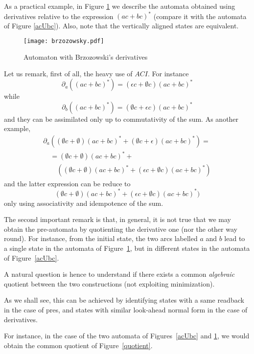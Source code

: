 \documentclass[preprint]{sigplanconf}
\newcommand{\der}[2]{\ensuremath{\partial_{#1}(#2)}}
\begin{document}
As a practical example, in Figure \ref{acUbc1} we describe 
the automata obtained using derivatives relative to the 
expression $(ac + bc)^*$ (compare it
with the automata of Figure \ref{acUbc}). Also, note that the
vertically aligned states are equivalent.

\begin{figure}[htp]
\begin{center}
\texttt{[image: brzozowsky.pdf]}
\caption{Automaton with Brzozowski's derivatives\label{acUbc1}}
\end{center}
\end{figure}

\noindent
Let us remark, first of all, the heavy use of $ACI$. For instance 
\[\der{a}{(ac+bc)^*} = (\epsilon c + \emptyset c)(ac+bc)^*\]
while
\[\der{b}{(ac+bc)^*} = (\emptyset c + \epsilon c)(ac+bc)^*\] 
and they can be assimilated only up to commutativity of the sum. 
As another example,
\[
\begin{array}{l}
\der{a}{(\emptyset c + \emptyset)(ac+bc)^* + (\emptyset c + \epsilon)(ac+bc)^*} =\\
\quad=(\emptyset c + \emptyset)(ac+bc)^* + \\
\quad\quad((\emptyset c + \emptyset)(ac+bc)^* + (\epsilon c + \emptyset c)(ac+bc)^*)
\end{array}
\]
and the latter expression can be reduce to
\[(\emptyset c + \emptyset)(ac+bc)^* + (\epsilon c + \emptyset c)(ac+bc)^*)\] 
only using associativity and idempotence of the sum.

The second important remark is that, in general, it is not true that we may 
obtain the pre-automata by quotienting the derivative one (nor the other way
round). For instance, from the initial state, the two arcs labelled $a$ and
$b$ lead to a single state in the automata of Figure~\ref{acUbc1}, but in different
states in the automata of Figure~\ref{acUbc}. 

A natural question is hence to
understand if there exists a common {\em algebraic} quotient between the two 
constructions (not exploiting minimization). 

As we shall see, this can be achieved by identifying states with a same
readback in the case of pres, and states with similar look-ahead normal
form in the case of derivatives.

For instance, in the case of the two automata of Figures~\ref{acUbc} and
\ref{acUbc1}, we would obtain the common quotient of Figure~\ref{quotient}.
\end{document}

